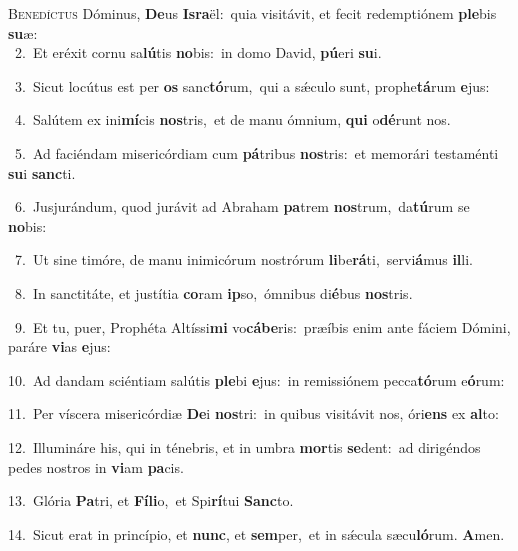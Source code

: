 \lettrine{\initial\textcolor{\initialcolor}{B}}{enedíctus} Dóminus, \textbf{De}\-us \textbf{Is}\-\textbf{ra}ël:~\star quia visitávit, et fecit redemptiónem \textbf{ple}\-bis \textbf{su}\-æ:\\
{\numbfont\textcolor{\numbcolor}{~2.}}~Et eréxit cornu sa\-\textbf{lú}\-tis \textbf{no}\-bis:~\star in domo David, \textbf{pú}\-eri \textbf{su}\-i.\par
{\numbfont\textcolor{\numbcolor}{~3.}}~Sicut locútus est per \textbf{os} sanc\-\textbf{tó}\-rum,~\star qui a sǽculo sunt, prophe\-\textbf{tá}\-rum \textbf{e}\-jus:\par
{\numbfont\textcolor{\numbcolor}{~4.}}~Salútem ex ini\-\textbf{mí}\-cis \textbf{nos}\-tris,~\star et de manu ómnium, \textbf{qui} o\-\textbf{dé}\-runt nos.\par
{\numbfont\textcolor{\numbcolor}{~5.}}~Ad faciéndam misericórdiam cum \textbf{pá}\-tribus \textbf{nos}\-tris:~\star et memorári testaménti \textbf{su}\-i \textbf{sanc}\-ti.\par
{\numbfont\textcolor{\numbcolor}{~6.}}~Jusjurándum, quod jurávit ad Abraham \textbf{pa}\-trem \textbf{nos}\-trum,~\star da\-\textbf{tú}\-rum se \textbf{no}\-bis:\par
{\numbfont\textcolor{\numbcolor}{~7.}}~Ut sine timóre, de manu inimicórum nostrórum \textbf{li}\-be\-\textbf{rá}\-ti,~\star servi\-\textbf{á}\-mus \textbf{il}\-li.\par
{\numbfont\textcolor{\numbcolor}{~8.}}~In sanctitáte, et justítia \textbf{co}\-ram \textbf{ip}\-so,~\star ómnibus di\-\textbf{é}\-bus \textbf{nos}\-tris.\par
{\numbfont\textcolor{\numbcolor}{~9.}}~Et tu, puer, Prophéta Altíssi\textbf{mi} vo\-\textbf{cá}\-\textbf{be}ris:~\star præíbis enim ante fáciem Dómini, paráre \textbf{vi}\-as \textbf{e}\-jus:\par
{\numbfont\textcolor{\numbcolor}{10.}}~Ad dandam sciéntiam salútis \textbf{ple}\-bi \textbf{e}\-jus:~\star in remissiónem pecca\-\textbf{tó}\-rum e\-\textbf{ó}\-rum:\par
{\numbfont\textcolor{\numbcolor}{11.}}~Per víscera misericórdiæ \textbf{De}\-i \textbf{nos}\-tri:~\star in quibus visitávit nos, óri\textbf{ens} ex \textbf{al}\-to:\par
{\numbfont\textcolor{\numbcolor}{12.}}~Illumináre his, qui in ténebris, et in umbra \textbf{mor}\-tis \textbf{se}\-dent:~\star ad dirigéndos pedes nostros in \textbf{vi}\-am \textbf{pa}\-cis.\par
{\numbfont\textcolor{\numbcolor}{13.}}~Glória \textbf{Pa}\-tri, et \textbf{Fí}\-\textbf{li}o,~\star et Spi\-\textbf{rí}\-tui \textbf{Sanc}\-to.\par
{\numbfont\textcolor{\numbcolor}{14.}}~Sicut erat in princípio, et \textbf{nunc}\-, et \textbf{sem}\-per,~\star et in sǽcula sæcu\-\textbf{ló}\-rum. \textbf{A}\-men.\par
